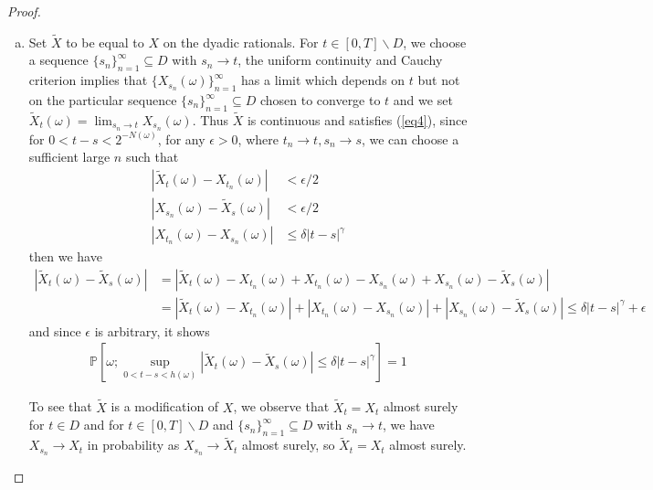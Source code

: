 \documentclass[a4paper,12pt]{article}
\theoremstyle{definition}
\begin{document}
\begin{proof}
\begin{enumerate}[(a)]
\item Set $\widetilde{X}$ to be equal to $X$ on the dyadic rationals.  For $t\in [0,T] \backslash D$, we choose a sequence $\{s_n\}_{n=1}^{\infty} \subseteq D$ with $s_n \to t$, the uniform continuity and Cauchy criterion implies that $\{X_{s_n}(\omega)\}_{n=1}^{\infty}$ has a limit which depends on $t$ but not on the particular sequence $\{s_n\}_{n=1}^{\infty} \subseteq D$ chosen to converge to $t$ and we set $\widetilde{X}_t(\omega) = \lim_{s_n\to t}X_{s_n}(\omega)$. Thus $\widetilde{X}$ is continuous and satisfies (\ref{eq4}), since for $0<t-s<2^{-N(\omega)}$, for any $\epsilon>0$, where $t_n \to t, s_n \to s$, we can choose a sufficient large $n$ such that 
\begin{align*}
|\widetilde{X}_t(\omega) - X_{t_n}(\omega)| &< \epsilon/2\\
|X_{s_n}(\omega) - \widetilde{X}_s(\omega)|&< \epsilon/2\\
|X_{t_n}(\omega)- X_{s_n}(\omega)| &\leq \delta |t-s|^\gamma
\end{align*}
then we have
\begin{align*}
|\widetilde{X}_t(\omega) - \widetilde{X}_s(\omega)| & = |\widetilde{X}_t(\omega) - X_{t_n}(\omega) + X_{t_n}(\omega)- X_{s_n}(\omega) + X_{s_n}(\omega) - \widetilde{X}_s(\omega)|\\
& = |\widetilde{X}_t(\omega) - X_{t_n}(\omega)| + |X_{t_n}(\omega)- X_{s_n}(\omega)| + |X_{s_n}(\omega) - \widetilde{X}_s(\omega)| \leq \delta |t-s|^\gamma + \epsilon
\end{align*} 
and since $\epsilon$ is arbitrary, it shows
\begin{align*}
\mathbb{P}\left[\omega; \sup_{0<t-s<h(\omega)}\left|\widetilde{X}_t(\omega)-\widetilde{X}_s(\omega)\right|\leq \delta|t-s|^\gamma\right]=1
\end{align*}



To see that $\widetilde{X}$ is a modification of $X$, we observe that $\widetilde{X}_t = X_t$ almost surely for $t \in D$ and for $t \in [0,T]  \backslash D$ and $\{s_n\}_{n=1}^{\infty}\subseteq D$ with $s_n \to t$, we have $X_{s_n} \to X_t$ in probability as $X_{s_n} \to \widetilde{X}_t$ almost surely, so $\widetilde{X}_t = X_t$ almost surely.


\end{enumerate}
\end{proof}
\end{document}
